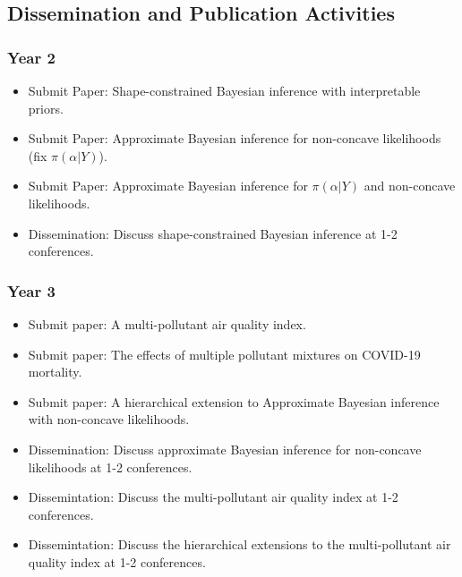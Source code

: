 \documentclass[12pt,letterpaper]{article}
\begin{document}
\clearpage
\vspace{10pt}

\hypertarget{dissemination-and-publication-activities}{%
\subsection{Dissemination and Publication
Activities}\label{dissemination-and-publication-activities}}

\hypertarget{year-2}{%
\subsubsection{Year 2}\label{year-2}}

\begin{itemize}
    \item Submit Paper: Shape-constrained Bayesian inference with interpretable priors.
    \item Submit Paper: Approximate Bayesian inference for non-concave likelihoods (fix $\pi(\alpha|Y)$). 
    \item Submit Paper: Approximate Bayesian inference for $\pi(\alpha|Y)$ and non-concave likelihoods.
    \item Dissemination: Discuss shape-constrained Bayesian inference at 1-2 conferences. 
\end{itemize}

\hypertarget{year-3}{%
\subsubsection{Year 3}\label{year-3}}

\begin{itemize}
    \item Submit paper: A multi-pollutant air quality index. 
    \item Submit paper: The effects of multiple pollutant mixtures on COVID-19 mortality.
    \item Submit paper: A hierarchical extension to Approximate Bayesian inference with non-concave likelihoods.
    \item Dissemination: Discuss approximate Bayesian inference for non-concave likelihoods at 1-2 conferences.  
    \item Dissemintation: Discuss the multi-pollutant air quality index at 1-2 conferences.
    \item Dissemintation: Discuss the hierarchical extensions to the multi-pollutant air quality index at 1-2 conferences.
\end{itemize}
\end{document}
